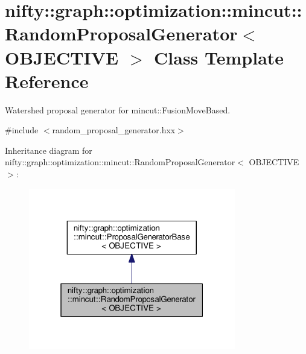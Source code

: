 \hypertarget{classnifty_1_1graph_1_1optimization_1_1mincut_1_1RandomProposalGenerator}{}\section{nifty\+:\+:graph\+:\+:optimization\+:\+:mincut\+:\+:Random\+Proposal\+Generator$<$ O\+B\+J\+E\+C\+T\+I\+V\+E $>$ Class Template Reference}
\label{classnifty_1_1graph_1_1optimization_1_1mincut_1_1RandomProposalGenerator}


Watershed proposal generator for mincut\+::\+Fusion\+Move\+Based.  




{\ttfamily \#include $<$random\+\_\+proposal\+\_\+generator.\+hxx$>$}



Inheritance diagram for nifty\+:\+:graph\+:\+:optimization\+:\+:mincut\+:\+:Random\+Proposal\+Generator$<$ O\+B\+J\+E\+C\+T\+I\+V\+E $>$\+:\nopagebreak
\begin{figure}[H]
\begin{center}
\leavevmode
\includegraphics[width=256pt]{classnifty_1_1graph_1_1optimization_1_1mincut_1_1RandomProposalGenerator__inherit__graph}
\end{center}
\end{figure}


